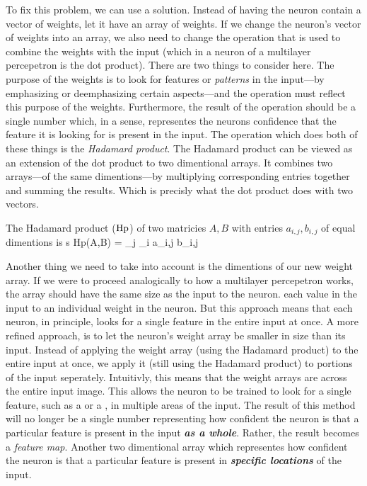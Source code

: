 To fix this problem, we can use a  solution.
Instead of having the neuron contain a vector of weights, let it have an array of weights.
If we change the neuron's vector of weights into an array, we also need to change the operation that is used to combine the weights with the input (which in a neuron of a multilayer percepetron is the dot product).
There are two things to consider here.
The purpose of the weights is to look for features or {\em patterns} in the input---by emphasizing or deemphasizing certain aspects---and the operation must reflect this purpose of the weights.
Furthermore, the result of the operation should be a single number which, in a sense, representes the neurons  confidence that the feature it is looking for is present in the input.
The operation which does both of these things is the {\em Hadamard product}.
The Hadamard product can be viewed as an extension of the dot product to two dimentional arrays.
It combines two arrays---of the same dimentions---by multiplying corresponding entries together and summing the results.
Which is precisly what the dot product does with two vectors.

The Hadamard product (${\rm Hp}$) of two matricies $A,B$ with entries $a_{i,j},b_{i,j}$ of equal dimentions is
s\tartplaceformula[reference=hdprod]
\startformula
{\rm Hp}(A,B) = \sum_{j} \sum_{i} a_{i,j} \cdot b_{i,j}
\stopformula
\stopplaceformula

\indentation
Another thing we need to take into account is the dimentions of our new weight array.
If we were to proceed analogically to how a multilayer percepetron works, the array should have the same size as the input to the neuron.
 each value in the input to an individual weight in the neuron.
But this approach means that each neuron, in principle, looks for a single feature in the entire input at once.
A more refined approach, is to let the neuron's weight array be smaller in size than its input.
Instead of applying the weight array (using the Hadamard product) to the entire input at once, we apply it (still using the Hadamard product) to portions of the input seperately.
Intuitivly, this means that the weight arrays are  across the entire input image.
This allows the neuron to be trained to look for a single feature, such as a  or a , in multiple areas of the input.
The result of this method will no longer be a single number representing how  confident the neuron is that a particular feature is present in the input {\em\bf as a whole}.
Rather, the result becomes a {\em feature map}.
Another two dimentional array which representes how  confident the neuron is that a particular feature is present in {\em\bf specific locations} of the input.

